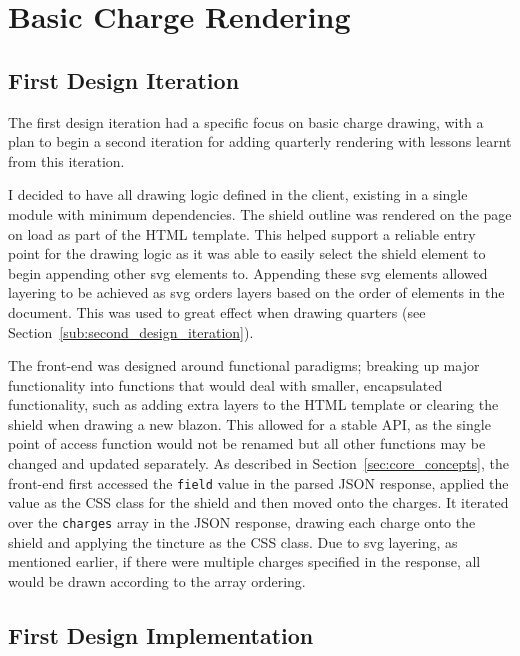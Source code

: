 \documentclass[nobib, a4paper, twoside, justified]{tufte-book}
\makeatletter
\newcommand{\svg}{\gls{svg}\@\xspace}
\newcommand{\charge}{\gls{charge}\@\xspace}
\newcommand{\charges}{\glspl{charge}\@\xspace}
\newcommand{\blazon}{\gls{blazon}\@\xspace}
\makeatother
\begin{document}
\section{Basic Charge Rendering}%
\label{sub:basic_charge_rendering}

\subsection{First Design Iteration}%
\label{sub:first_design_iteration}

The first design iteration had a specific focus on basic \charge drawing, with a plan to begin a
second iteration for adding quarterly rendering with lessons learnt from this iteration.

I decided to have all drawing logic defined in the client, existing in a single module with minimum
dependencies. The shield outline was rendered on the page on load as part of the HTML template.
This helped support a reliable entry point for the drawing logic as it was able to easily select
the shield element to begin appending other \svg elements to. Appending these \svg elements
allowed layering to be achieved as \svg orders layers based on the order of elements in the
document. This was used to great effect when drawing quarters (see
Section~\ref{sub:second_design_iteration}).

The front-end was designed around functional paradigms; breaking up major functionality into
functions that would deal with smaller, encapsulated functionality, such as adding extra layers to
the HTML template or clearing the shield when drawing a new \blazon. This allowed for a stable API,
as the single point of access function would not be renamed but all other functions may be changed
and updated separately. As described in Section~\ref{sec:core_concepts}, the front-end first
accessed the \texttt{field} value in the parsed JSON response, applied the value as the CSS class
for the shield and then moved onto the \charges. It iterated over the \texttt{\charges} array in
the JSON response, drawing each \charge onto the shield and applying the tincture as the CSS class.
Due to \svg layering, as mentioned earlier, if there were multiple \charges specified in the
response, all would be drawn according to the array ordering.

\subsection{First Design Implementation}%
\label{sub:first_design_implementation}
\end{document}
